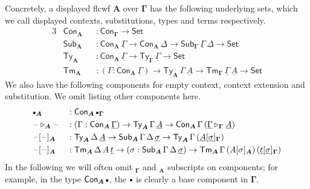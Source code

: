 \documentclass[12pt,a4paper,twoside,openany]{book}
\theoremstyle{remark}
\theoremstyle{definition}
\theoremstyle{theorem}
\newcommand{\Con}{\mathsf{Con}}
\newcommand{\Sub}{\mathsf{Sub}}
\newcommand{\Tm}{\mathsf{Tm}}
\newcommand{\Ty}{\mathsf{Ty}}
\newcommand{\blank}{\mathord{\hspace{1pt}\text{--}\hspace{1pt}}}
\newcommand{\ra}{\rightarrow}
\newcommand{\Set}{\mathsf{Set}}
\newcommand{\ext}{\triangleright}
\newcommand{\emptycon}{\scaleobj{.75}\bullet}
\newcommand{\bTy}{\boldsymbol{\Ty}}
\newcommand{\bGamma}{\boldsymbol{\Gamma}}
\newcommand{\bA}{\boldsymbol{A}}
\newcommand{\ul}[1]{\underline{#1}}
\newcommand{\ulGamma}{\ul{\Gamma}}
\newcommand{\ulDelta}{\ul{\Delta}}
\newcommand{\ulsigma}{\ul{\sigma}}
\newcommand{\ult}{\ul{t}}
\newcommand{\ulA}{\ul{A}}
\begin{document}
Concretely, a displayed flcwf $\bA$ over $\bGamma$ has the following underlying
sets, which we call displayed contexts, substitutions, types and terms
respectively.
\begin{alignat*}{3}
  & \Con_{\bA} && : \Con_{\bGamma}\ra \Set\\
  & \Sub_{\bA} && : \Con_{\bA}\,\ulGamma \ra \Con_{\bA}\,\ulDelta \ra \Sub_{\bGamma}\,\ulGamma\,\ulDelta \ra \Set \\
  & \Ty_{\bA}  && : \Con_{\bA}\,\ulGamma \ra \Ty_{\bGamma}\,\ulGamma \ra \Set\\
  & \Tm_{\bA}  && : (\Gamma : \Con_{\bA}\,\ulGamma)\ra \Ty_{\bA}\,\Gamma\,\ulA \ra \Tm_{\bGamma}\,\ulGamma\,\ulA \ra \Set
\end{alignat*}
We also have the following components for empty context, context
extension and substitution. We omit listing other components here.
\begin{alignat*}{3}
  & \emptycon_{\bA} && : \Con_{\bA}\,\emptycon_{\bGamma}\\
  & \blank\ext_{\bA}\blank && : (\Gamma : \Con_{\bA}\,\ulGamma)\ra \Ty_{\bA}\,\Gamma\,\ulA \ra
                     \Con_{\bA}\,\Gamma\,(\ulGamma \ext_{\bGamma} \ulA)\\
  & \blank[\blank]_{\bA} && : \Ty_{\bA}\,\Delta\,\ulA \ra \Sub_{\bA}\,\Gamma\,\Delta\,\ulsigma
                     \ra \Ty_{\bA}\,\Gamma\, (\ulA[\ulsigma]_{\bGamma})\\
  & \blank[\blank]_{\bA} && : \Tm_{\bA}\,\Delta\,A\,\ult \ra (\sigma : \Sub_{\bA}\,\Gamma\,\Delta\,\ulsigma)
                        \ra \Tm_{\bA}\,\Gamma\, (A[\sigma]_{\bA})\,(\ult[\ulsigma]_{\bGamma})
\end{alignat*}
In the following we will often omit $_{\bGamma}$ and $_{\bA}$ subscripts on
components; for example, in the type $\Con_{\bA}\,\emptycon$, the $\emptycon$ is
clearly a base component in $\bGamma$.



\end{document}
